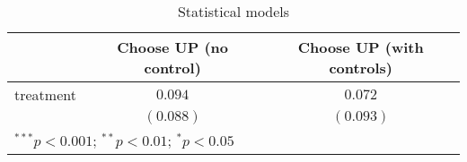 
\begin{table}
\begin{center}
\begin{tabular}{l c c}
\hline
 & Choose UP (no control) & Choose UP (with controls) \\
\hline
treatment & $0.094$   & $0.072$   \\
          & $(0.088)$ & $(0.093)$ \\
\hline
\multicolumn{3}{l}{\scriptsize{$^{***}p<0.001$; $^{**}p<0.01$; $^{*}p<0.05$}}
\end{tabular}
\caption{Statistical models}
\label{Table S5: Average Treatment Effects}
\end{center}
\end{table}
